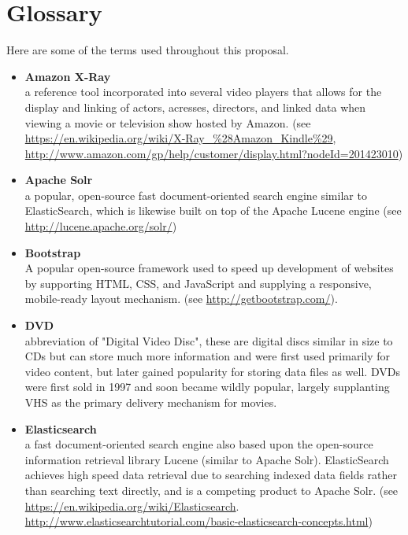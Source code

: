 %
\pagestyle{empty}
\hfill
{}
\section*{Glossary}


Here are some of the terms used throughout this proposal.

\begin{itemize}[leftmargin=*]
\label{glossary:amazon-x-ray}
\item \textbf{Amazon X-Ray} \\
	a reference tool incorporated into several video players that allows for the display and linking of actors, acresses, directors, and linked data when viewing a movie or television show hosted by Amazon. (see \url{https://en.wikipedia.org/wiki/X-Ray_%28Amazon_Kindle%29}, \url{http://www.amazon.com/gp/help/customer/display.html?nodeId=201423010})
\label{glossary:apache-solr}
\item \textbf{Apache Solr} \\
	a popular, open-source fast document-oriented search engine similar to ElasticSearch, which is likewise built on top of the Apache Lucene engine (see \url{http://lucene.apache.org/solr/})
\label{glossary:bootstrap}
\item \textbf{Bootstrap} \\
	A popular open-source framework used to speed up development of websites by supporting HTML, CSS, and JavaScript and supplying a responsive, mobile-ready layout mechanism. (see \url{http://getbootstrap.com/}).
\label{glossary:dvd}
\item \textbf{DVD} \\
	abbreviation of "Digital Video Disc", these are digital discs similar in size to CDs but can store much more information and were first used primarily for video content, but later gained popularity for storing data files as well.  DVDs were first sold in 1997 and soon became wildly popular, largely supplanting VHS as the primary delivery mechanism for movies.
\label{glossary:elasticsearch}
\item \textbf{Elasticsearch} \\
	a fast document-oriented search engine also based upon the open-source information retrieval library Lucene (similar to Apache Solr).  ElasticSearch achieves high speed data retrieval due to searching indexed data fields rather than searching text directly, and is a competing product to Apache Solr. (see \url{https://en.wikipedia.org/wiki/Elasticsearch}. \url{http://www.elasticsearchtutorial.com/basic-elasticsearch-concepts.html})

\end{itemize}
